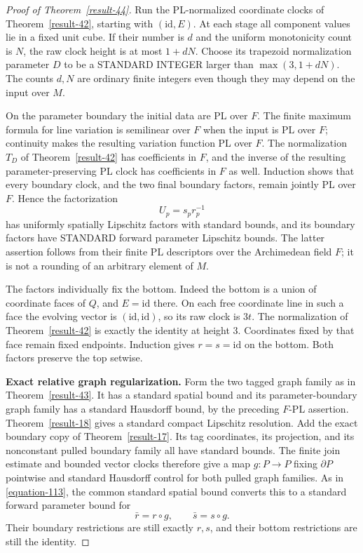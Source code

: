 \documentclass[11pt,a4paper]{article}
\theoremstyle{definition}
\begin{document}
\begin{proof}[Proof of Theorem~\ref{result-44}]
Run the PL-normalized coordinate clocks of Theorem~\ref{result-42}, starting
with $(\mathrm{id},E)$. At each stage all component values
lie in a fixed unit cube. If their number is $d$ and the
uniform monotonicity count is $N$, the raw clock height is
at most $1+dN$. Choose its trapezoid normalization parameter
$D$ to be a STANDARD INTEGER larger than $\max(3,1+dN)$.
The counts $d,N$ are ordinary finite integers even though
they may depend on the input over $M$.

On the parameter boundary the initial data are PL over $F$.
The finite maximum formula for line variation is semilinear
over $F$ when the input is PL over $F$; continuity makes
the resulting variation function PL over $F$. The
normalization $T_D$ of Theorem~\ref{result-42} has coefficients in $F$,
and the inverse of the resulting parameter-preserving PL
clock has coefficients in $F$ as well. Induction shows
that every boundary clock, and the two final boundary
factors, remain jointly PL over $F$.
Hence the factorization
\begin{equation}
 U_p=s_pr_p^{-1}
 \label{equation-116}
\end{equation}
has uniformly spatially Lipschitz factors with standard
bounds, and its boundary factors have STANDARD forward
parameter Lipschitz bounds. The latter assertion follows
from their finite PL descriptors over the Archimedean field
$F$; it is not a rounding of an arbitrary element of $M$.

The factors individually fix the bottom. Indeed the bottom
is a union of coordinate faces of $Q$, and $E=\mathrm{id}$
there. On each free coordinate line in such a face the
evolving vector is $(\mathrm{id},\mathrm{id})$, so its raw
clock is $3t$. The normalization of Theorem~\ref{result-42} is exactly the
identity at height $3$. Coordinates fixed by that face
remain fixed endpoints. Induction gives $r=s=\mathrm{id}$
on the bottom. Both factors preserve the top setwise.

\textbf{Exact relative graph regularization.}\quad
Form the two tagged graph family as in Theorem~\ref{result-43}. It has a
standard spatial bound and its parameter-boundary graph
family has a standard Hausdorff bound, by the preceding
$F$-PL assertion. Theorem~\ref{result-18} gives a standard compact Lipschitz
resolution. Add the exact boundary copy of Theorem~\ref{result-17}.
Its tag coordinates, its projection, and its nonconstant
pulled boundary family all have standard bounds.
The finite join estimate and bounded vector clocks
therefore give a map $g:P\to P$ fixing $\partial P$
pointwise and standard Hausdorff control for both pulled
graph families. As in \eqref{equation-113}, the common standard
spatial bound converts this to a standard forward
parameter bound for
\[
 \bar r=r\circ g,\qquad \bar s=s\circ g.
\]
Their boundary restrictions are still exactly $r,s$,
and their bottom restrictions are still the identity.


\end{proof}
\end{document}
